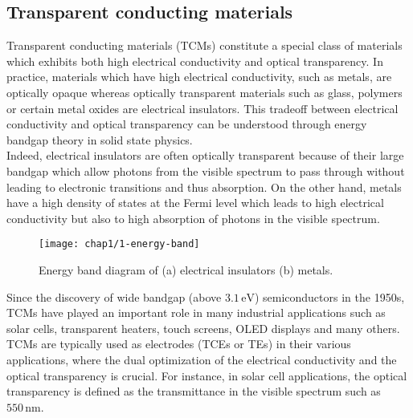\subsection{Transparent conducting materials}
    Transparent conducting materials (TCMs) constitute a special class of materials which exhibits both high electrical conductivity and optical transparency. In practice, materials which have high electrical conductivity, such as metals, are optically opaque whereas optically transparent materials such as glass, polymers or certain metal oxides are electrical insulators. This tradeoff between electrical conductivity and optical transparency can be understood through energy bandgap theory in solid state physics.\\
    Indeed, electrical insulators are often optically transparent because of their large bandgap 
    which allow photons from the visible spectrum to pass through without leading to electronic transitions and thus absorption. On the other hand, metals have a high density of states at the Fermi level which leads to high electrical conductivity but also to high absorption of photons in the visible spectrum.
    \begin{figure}[H]
        \centering
        \texttt{[image: chap1/1-energy-band]}
        \caption{Energy band diagram of (a) electrical insulators (b) metals.}
        \label{fig:1-bandgap}
    \end{figure}
    Since the discovery of wide bandgap (above $3.1\,\text{eV}$) semiconductors in the 1950s, TCMs have played an important role in many industrial applications such as solar cells, transparent heaters, touch screens, OLED displays and many others. TCMs are typically used as electrodes (TCEs or TEs) in their various applications, where the dual optimization of the electrical conductivity and the optical transparency is crucial. For instance, in solar cell applications, the optical transparency is defined as the transmittance in the visible spectrum such as $550\,\text{nm}$.
